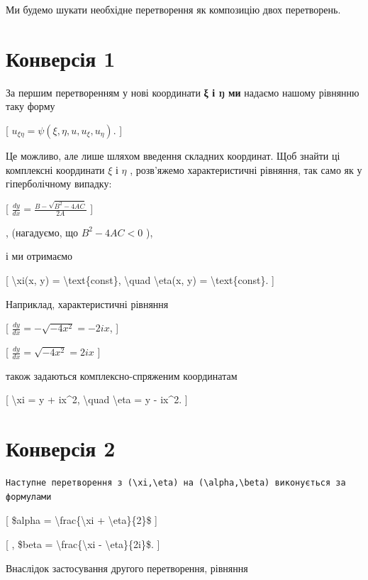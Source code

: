 \documentclass[
]{article}
\begin{document}
{{{Ми будемо шукати необхідне перетворення як композицію двох перетворень.

\section{Конверсія
1}\label{ux43aux43eux43dux432ux435ux440ux441ux456ux44f-1}

За першим перетворенням у нові координати \textbf{ξ і ŋ ми} надаємо
нашому рівнянню таку форму

{[} \(u_{\xi\eta} = \psi(\xi, \eta, u, u_{\xi}, u_{\eta})\). {]}

Це можливо, але лише шляхом введення складних координат. Щоб знайти ці
комплексні координати \(\xi\) і \(\eta\) , розв'яжемо характеристичні
рівняння, так само як у гіперболічному випадку:

{[} \(\frac{dy}{dx} = \frac{B - \sqrt{B^2 - 4AC}}{2A}\) {]}

, (нагадуємо, що \(B^2 - 4AC < 0\) ),

і ми отримаємо

{[} \textbackslash xi(x, y) = \textbackslash text\{const\},
\textbackslash quad \textbackslash eta(x, y) =
\textbackslash text\{const\}. {]}

Наприклад, характеристичні рівняння

{[} \(\frac{dy}{dx} = -\sqrt{-4x^2} = -2ix\), {]}

{[} \(\frac{dy}{dx} = \sqrt{-4x^2} = 2ix\) {]}

також задаються комплексно-спряженим координатам

{[} \textbackslash xi = y + ix\^{}2, \textbackslash quad
\textbackslash eta = y - ix\^{}2. {]}

\section{Конверсія
2}\label{ux43aux43eux43dux432ux435ux440ux441ux456ux44f-2}

\begin{verbatim}
Наступне перетворення з (\xi,\eta) на (\alpha,\beta) виконується за формулами
\end{verbatim}

{[} \$alpha = \textbackslash frac\{\textbackslash xi +
\textbackslash eta\}\{2\}\$ {]}

{[} , \$beta = \textbackslash frac\{\textbackslash xi -
\textbackslash eta\}\{2i\}\$. {]}

Внаслідок застосування другого перетворення, рівняння

}}}
\end{document}
